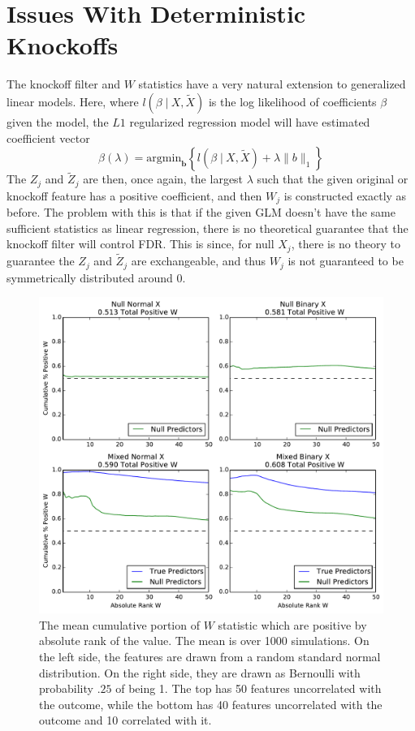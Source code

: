 \documentclass[11pt]{article}
\newcommand{\st}{ \; \big | \:}
\theoremstyle{definition}
\begin{document}
\section{Issues With Deterministic Knockoffs} 
    The knockoff filter and $W$ statistics have a very natural extension to generalized linear models. Here, where $l(\beta\st X, \tilde X)$ is the log likelihood of coefficients $\beta$ given the model, the $L1$ regularized regression model will have estimated coefficient vector
    \[ \beta(\lambda) = \textrm{argmin}_\mathbf b \left\{l(\beta\st X, \tilde X) + \lambda\|b\|_1 \right\}\]
    The $Z_j$ and $\tilde Z_j$ are then, once again, the largest $\lambda$ such that the given original or knockoff feature has a positive coefficient, and then $W_j$ is constructed exactly as before. The problem with this is that if the given GLM doesn't have the same sufficient statistics as linear regression, there is no theoretical guarantee that the knockoff filter will control FDR. This is since, for null $X_j$, there is no theory to guarantee the $Z_j$ and $\tilde Z_j$ are exchangeable, and thus $W_j$ is not guaranteed to be symmetrically distributed around $0$. \par
    \begin{figure}[h]
        \begin{center}
        \includegraphics[width=14cm]{images/entryrate_original_logit}
    \end{center}
        \caption{The mean cumulative portion of $W$ statistic which are positive by absolute rank of the value. The mean is over 1000 simulations. On the left side, the features are drawn from a random standard normal distribution. On the right side, they are drawn as Bernoulli with probability $.25$ of being 1. The top has 50 features uncorrelated with the outcome, while the bottom has 40 features uncorrelated with the outcome and 10 correlated with it.}
    \end{figure}
 
\end{document}
